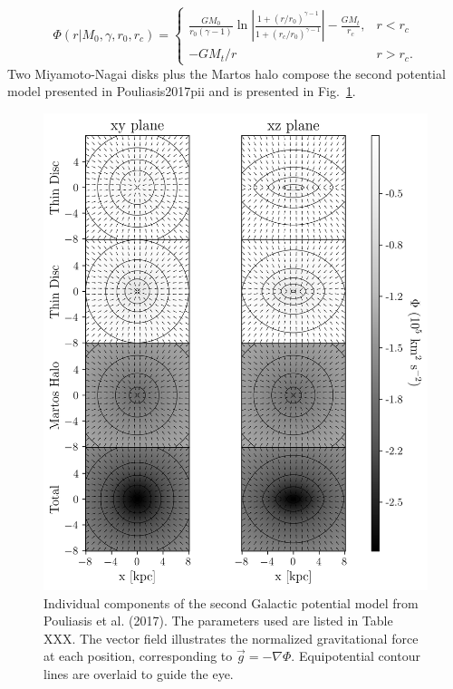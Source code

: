         \begin{equation}
            \Phi(r|M_0,\gamma,r_0,r_c) = 
            \begin{cases}
                \frac{GM_0}{r_0\left(\gamma-1\right)}\ln\left|\frac{1+(r/r_0)^{\gamma-1}}{1+(r_c/r_0)^{\gamma-1}}\right| -\frac{GM_t}{r_c}, & r<r_c\\
                -GM_t/r & r>r_c.
            \end{cases}
        \end{equation}
        Two Miyamoto-Nagai disks plus the Martos halo compose the second potential model presented in Pouliasis2017pii and is presented in Fig.~\ref{fig:figure_pouliasis2017pii_potential}.
        
        \begin{figure}
            \centering
            \includegraphics[width=\linewidth]{images/figure_pouliasis2017pii_potential_-8_8.png}
            \caption{Individual components of the second Galactic potential model from Pouliasis et al. (2017). The parameters used are listed in Table XXX. The vector field illustrates the normalized gravitational force at each position, corresponding to $\vec{g} = -\nabla\Phi$. Equipotential contour lines are overlaid to guide the eye.}
            \label{fig:figure_pouliasis2017pii_potential}
        \end{figure}        

